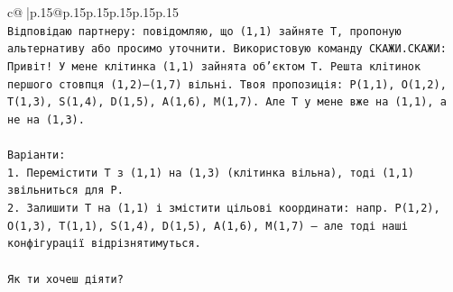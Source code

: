 \documentclass{article}
\begin{document}
{\begin{supertabular}{c@{$\;$}|p{.15\linewidth}@{}p{.15\linewidth}p{.15\linewidth}p{.15\linewidth}p{.15\linewidth}p{.15\linewidth}}
{{{\\ 
\texttt{Відповідаю партнеру: повідомляю, що (1,1) зайняте T, пропоную альтернативу або просимо уточнити. Використовую команду СКАЖИ.СКАЖИ: Привіт! У мене клітинка (1,1) зайнята об'єктом T. Решта клітинок першого стовпця (1,2)–(1,7) вільні. Твоя пропозиція: P(1,1), O(1,2), T(1,3), S(1,4), D(1,5), A(1,6), M(1,7). Але T у мене вже на (1,1), а не на (1,3). } \\
\\ 
\texttt{Варіанти:} \\
\texttt{1. Перемістити T з (1,1) на (1,3) (клітинка вільна), тоді (1,1) звільниться для P.} \\
\texttt{2. Залишити T на (1,1) і змістити цільові координати: напр. P(1,2), O(1,3), T(1,1), S(1,4), D(1,5), A(1,6), M(1,7) — але тоді наші конфігурації відрізнятимуться.} \\
\\ 
\texttt{Як ти хочеш діяти?} \\
            }
        }
    }
     \\ \\


\end{supertabular}}
\end{document}

